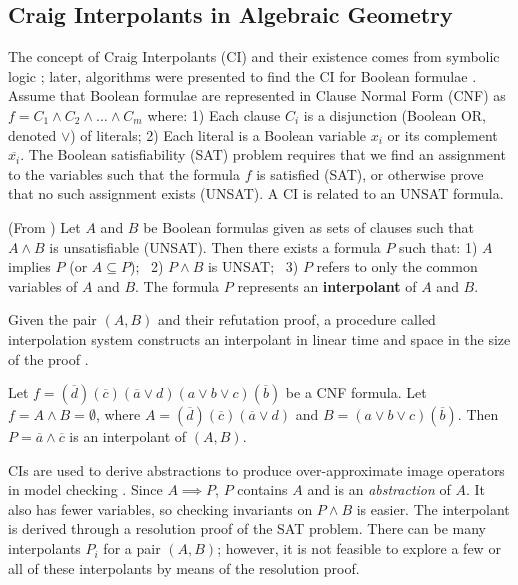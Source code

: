 \subsection{Craig Interpolants in Algebraic Geometry}
The concept of Craig Interpolants (CI) and their existence comes from
symbolic logic \cite{craig-interpolate}; later, algorithms were
presented to find the CI for Boolean formulae
\cite{pudlak:ci} \cite{mcmillan2003interpolation}. Assume that Boolean
formulae are represented in Clause Normal Form (CNF) as 
$f = C_1 \wedge C_2 \wedge \dots \wedge C_m$ where: 1) Each clause
$C_i$ is a disjunction (Boolean OR, denoted $\vee$) of literals; 2)
Each literal is a Boolean variable $x_i$ or its complement
$\overline{x_i}$. 
The Boolean satisfiability (SAT) problem requires that we find an
assignment to the variables such that the formula $f$ is satisfied
(SAT), or otherwise prove that no such assignment exists (UNSAT). 
A CI is related to an UNSAT formula. 

\begin{Definition}
(From \cite{mcmillan2003interpolation}) Let $A$ and $B$ be Boolean
  formulas given as sets of clauses such that $A \wedge B$ is
  unsatisfiable (UNSAT). Then there exists a formula $P$ such that: 
1) $A$ implies $P$ (or $A \subseteq P$); ~2) $P \wedge B$ is UNSAT; ~3)
$P$ refers to only the common variables of $A$ and $B$. The formula
$P$ represents an {\bf interpolant} of $A$ and $B$. 

Given  the pair $(A, B)$ and their refutation proof, a procedure
called interpolation system constructs an interpolant in linear time
and space in the size of the proof \cite{mcmillan2003interpolation}
\cite{pudlak:ci}. 
\end{Definition}

\begin{Example}\label{ex1}
Let $f = (\overline{d})(\overline{c})(\overline{a}\vee d)(a
\vee b \vee c)(\overline{b})$ be a CNF formula. Let $f = A \wedge B =
\emptyset$, where $A = (\overline{d})(\overline{c})(\overline{a}\vee
d)$ and  $B = (a \vee b \vee c)(\overline{b})$. Then $P = \overline{a}
\wedge \overline{c}$ is an interpolant of $(A, B)$. 
\end{Example}

CIs are used to derive abstractions to produce over-approximate image
operators in model checking \cite{mcmillan2003interpolation}. Since $A
\implies P$, $P$ contains $A$ and is an {\it abstraction} of $A$. It
also has fewer variables, so checking  invariants on $P \wedge B$ is
easier. The interpolant is derived through a resolution proof of the
SAT problem. There can be many interpolants $P_i$ for a pair $(A,B)$; 
however, it is not feasible to explore a few or all of these
interpolants by means of the resolution proof. 


